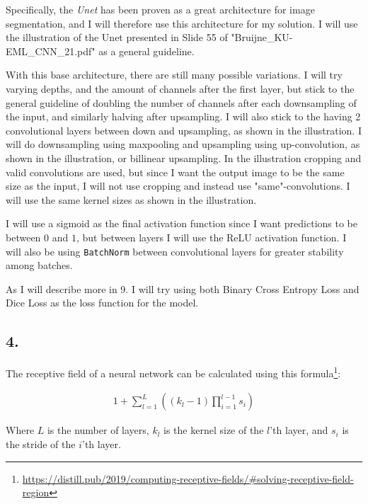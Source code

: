 \documentclass[a4paper, 12pt]{article}
\begin{document}
Specifically, the \textit{Unet} has been proven as a great architecture for image segmentation, and I will therefore use this architecture for my solution. I will use the illustration of the Unet presented in Slide 55 of "Bruijne\_KU-EML\_CNN\_21.pdf" as a general guideline.

With this base architecture, there are still many possible variations. I will try varying depths, and the amount of channels after the first layer, but stick to the general guideline of doubling the number of channels after each downsampling of the input, and similarly halving after upsampling. I will also stick to the having 2 convolutional layers between down and upsampling, as shown in the illustration. I will do downsampling using maxpooling and upsampling using up-convolution, as shown in the illustration, or billinear upsampling. In the illustration cropping and valid convolutions are used, but since I want the output image to be the same size as the input, I will not use cropping and instead use "same"-convolutions. I will use the same kernel sizes as shown in the illustration.

I will use a sigmoid as the final activation function since I want predictions to be between $0$ and $1$, but between layers I will use the ReLU activation function.
I will also be using \texttt{BatchNorm} between convolutional layers for greater stability among batches.

As I will describe more in 9. I will try using both Binary Cross Entropy Loss and Dice Loss as the loss function for the model.

\subsection{4.}

The receptive field of a neural network can be calculated using this formula\footnote{ \url{https://distill.pub/2019/computing-receptive-fields/\#solving-receptive-field-region}}:

\begin{align}
	1 + \sum_{l=1}^{L} \left((k_l - 1) \prod_{i=1}^{l - 1} s_i\right)
\end{align}

Where $L$ is the number of layers, $k_l$ is the kernel size of the $l$'th layer, and $s_i$ is the stride of the $i$'th layer. 
\end{document}

